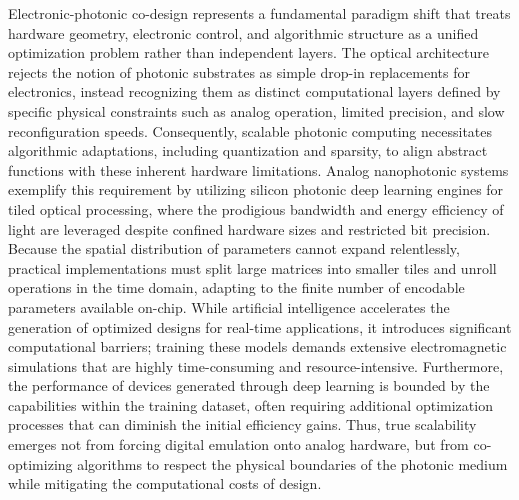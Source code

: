 \documentclass[11pt]{article}
\begin{document}
Electronic-photonic co-design represents a fundamental paradigm shift that treats hardware geometry, electronic control, and algorithmic structure as a unified optimization problem rather than independent layers. \citep{doi_10_48550_arxiv_2410_01289_34dceec6} \citep{doi_10_1145_3658617_3697771_aa4ee9ae} The optical architecture rejects the notion of photonic substrates as simple drop-in replacements for electronics, instead recognizing them as distinct computational layers defined by specific physical constraints such as analog operation, limited precision, and slow reconfiguration speeds. Consequently, scalable photonic computing necessitates algorithmic adaptations, including quantization and sparsity, to align abstract functions with these inherent hardware limitations. Analog nanophotonic systems exemplify this requirement by utilizing silicon photonic deep learning engines for tiled optical processing, where the prodigious bandwidth and energy efficiency of light are leveraged despite confined hardware sizes and restricted bit precision. Because the spatial distribution of parameters cannot expand relentlessly, practical implementations must split large matrices into smaller tiles and unroll operations in the time domain, adapting to the finite number of encodable parameters available on-chip. While artificial intelligence accelerates the generation of optimized designs for real-time applications, it introduces significant computational barriers; training these models demands extensive electromagnetic simulations that are highly time-consuming and resource-intensive. Furthermore, the performance of devices generated through deep learning is bounded by the capabilities within the training dataset, often requiring additional optimization processes that can diminish the initial efficiency gains. Thus, true scalability emerges not from forcing digital emulation onto analog hardware, but from co-optimizing algorithms to respect the physical boundaries of the photonic medium while mitigating the computational costs of design. \citep{doi_10_1515_nanoph_2024_0536_4b6631ba} \citep{doi_10_1515_nanoph_2022_0423_38a2c3ec}
\end{document}
